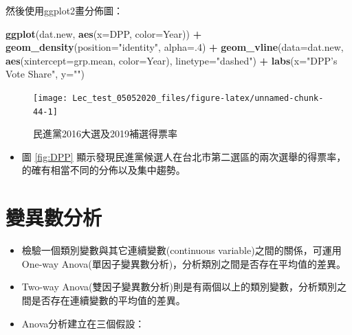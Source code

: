 \documentclass[hyperref,]{ctexart}
\newenvironment{Shaded}{\begin{snugshade}}{\end{snugshade}}
\newcommand{\DataTypeTok}[1]{\textcolor[rgb]{0.13,0.29,0.53}{#1}}
\newcommand{\DecValTok}[1]{\textcolor[rgb]{0.00,0.00,0.81}{#1}}
\newcommand{\KeywordTok}[1]{\textcolor[rgb]{0.13,0.29,0.53}{\textbf{#1}}}
\newcommand{\NormalTok}[1]{#1}
\newcommand{\OperatorTok}[1]{\textcolor[rgb]{0.81,0.36,0.00}{\textbf{#1}}}
\newcommand{\StringTok}[1]{\textcolor[rgb]{0.31,0.60,0.02}{#1}}
\providecommand{\tightlist}{%
  \setlength{\itemsep}{0pt}\setlength{\parskip}{0pt}}
\begin{document}
然後使用ggplot2畫分佈圖：

\begin{Shaded}
\begin{Highlighting}[]
\KeywordTok{ggplot}\NormalTok{(dat.new, }\KeywordTok{aes}\NormalTok{(}\DataTypeTok{x=}\NormalTok{DPP, }\DataTypeTok{color=}\NormalTok{Year)) }\OperatorTok{+}
\StringTok{  }\KeywordTok{geom_density}\NormalTok{(}\DataTypeTok{position=}\StringTok{"identity"}\NormalTok{, }\DataTypeTok{alpha=}\NormalTok{.}\DecValTok{4}\NormalTok{) }\OperatorTok{+}
\StringTok{  }\KeywordTok{geom_vline}\NormalTok{(}\DataTypeTok{data=}\NormalTok{dat.new, }\KeywordTok{aes}\NormalTok{(}\DataTypeTok{xintercept=}\NormalTok{grp.mean, }\DataTypeTok{color=}\NormalTok{Year),}
             \DataTypeTok{linetype=}\StringTok{"dashed"}\NormalTok{) }\OperatorTok{+}
\StringTok{  }\KeywordTok{labs}\NormalTok{(}\DataTypeTok{x=}\StringTok{"DPP's Vote Share"}\NormalTok{, }\DataTypeTok{y=}\StringTok{""}\NormalTok{)}
\end{Highlighting}
\end{Shaded}

\begin{figure}

\texttt{[image: Lec\_test\_05052020\_files/figure-latex/unnamed-chunk-44-1]} \hfill{}

\caption{\label{fig:DPP}民進黨2016大選及2019補選得票率}\label{fig:unnamed-chunk-44}
\end{figure}

\begin{itemize}
\tightlist
\item
  圖 \ref{fig:DPP}
  顯示發現民進黨候選人在台北市第二選區的兩次選舉的得票率，的確有相當不同的分佈以及集中趨勢。
\end{itemize}

\hypertarget{ux8b8aux7570ux6578ux5206ux6790}{%
\section{變異數分析}\label{ux8b8aux7570ux6578ux5206ux6790}}

\begin{itemize}
\item
  檢驗一個類別變數與其它連續變數(continuous
  variable)之間的關係，可運用One-way
  Anova(單因子變異數分析)，分析類別之間是否存在平均值的差異。
\item
  Two-way
  Anova(雙因子變異數分析)則是有兩個以上的類別變數，分析類別之間是否存在連續變數的平均值的差異。
\item
  Anova分析建立在三個假設：
\end{itemize}
\end{document}
